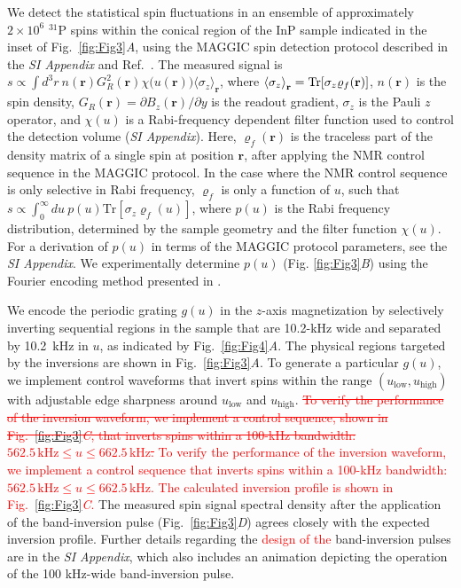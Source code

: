 \documentclass[9pt,twocolumn,twoside,lineno]{pnas-new}
\newcommand{\RB}[3][{}]{\textcolor{red}{\sout{#2} #3\ul{#1}}}
\begin{document}
We detect the statistical spin fluctuations in an ensemble of approximately $2\times 10^6$ $^{31}$P spins within the conical region of the InP sample indicated in the inset of  Fig.~\ref{fig:Fig3}\textit{A}, using the MAGGIC spin detection protocol described in the \textit{SI Appendix} and Ref.~\cite{Rose2018}.
The measured signal is $s\propto \int d^3 r~n(\mathbf{r}) G_R^2(\mathbf{r}) \chi\big(u(\mathbf{r})\big) \langle \sigma_z\rangle_{\mathbf{r}}$, where $\expval{\sigma_z}_{\mathbf{r}} = \mathrm{Tr}[\sigma_z \varrho_f(\mathbf{r})]$, $n(\mathbf{r})$ is the spin density, $G_R(\mathbf{r}) = \partial B_z(\mathbf{r})/\partial y$ is the readout gradient, $\sigma_z$ is the Pauli $z$ operator, and $\chi(u)$ is a Rabi-frequency dependent filter function used to control the detection volume (\textit{SI Appendix}).
Here, $\varrho_f(\mathbf{r})$ is the traceless part of the density matrix of a single spin at position $\mathbf{r}$, after applying the NMR control sequence in the MAGGIC protocol.
In the case where the NMR control sequence is only selective in Rabi frequency, $\varrho_f$ is only a function of $u$, such that $s \propto \int_0^\infty du~p(u)\mathrm{Tr}[\sigma_z  \varrho_f(u)]$, where $p(u)$ is the Rabi frequency distribution, determined by the sample geometry and the filter function $\chi(u)$.
For a derivation of $p(u)$ in terms of the MAGGIC protocol parameters, see the \textit{SI Appendix}.
We experimentally determine $p(u)$ (Fig. \ref{fig:Fig3}\textit{B}) using the Fourier encoding method presented in \cite{Rose2018}.

We encode the periodic grating $g(u)$ in the $z$-axis magnetization by selectively inverting sequential regions in the sample that are 10.2-kHz wide and separated by 10.2~kHz in $u$, as indicated by Fig.~\ref{fig:Fig4}\textit{A}.
The physical regions targeted by the inversions are shown in
Fig.~\ref{fig:Fig3}\textit{A}.
To generate a particular $g(u)$, we implement control waveforms that invert spins within the range $(u_{\text{low}}, u_{\text{high}})$ with adjustable edge sharpness around $u_{\text{low}}$ and $u_{\text{high}}$.
\RB{To verify the performance of the inversion waveform, we implement a control sequence, shown in Fig.~\ref{fig:Fig3}\textit{C}, that inverts spins within a 100-kHz bandwidth: $562.5\,\text{kHz} \leq u \leq  662.5\,\text{kHz}$.}{To verify the performance of the inversion waveform, we implement a control sequence that inverts spins within a 100-kHz bandwidth: $562.5\,\text{kHz} \leq u \leq  662.5\,\text{kHz}$. The calculated inversion profile is shown in Fig.~\ref{fig:Fig3}\textit{C}.} The measured spin signal spectral density after the application of the band-inversion pulse (Fig.~\ref{fig:Fig3}\textit{D}) agrees closely with the expected inversion profile.
Further details regarding the \RB{}{design of the} band-inversion pulses are in the \textit{SI Appendix}, which also includes an animation depicting the operation of the 100 kHz-wide band-inversion pulse.
\end{document}
